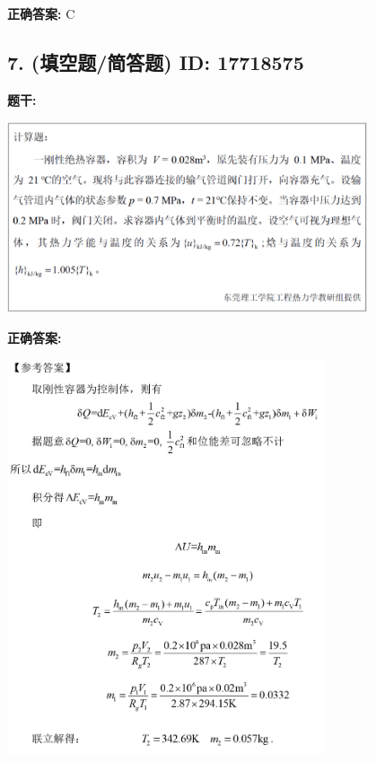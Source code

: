\documentclass[12pt]{article}
\begin{document}
\textbf{正确答案:}
C

\vspace{0.5em}\hrulefill\vspace{1em}

\subsection*{7. (填空题/简答题) \small ID: 17718575}

\textbf{题干:}


\begin{center}\includegraphics[width=0.8\textwidth, height=0.25\textheight, keepaspectratio]{question_7_17718575/title_img_1.png}\end{center}

\textbf{正确答案:}

\begin{center}\includegraphics[width=0.7\textwidth, height=0.2\textheight, keepaspectratio]{question_7_17718575/correct_answer_1_img_1.png}\end{center}
\end{document}
